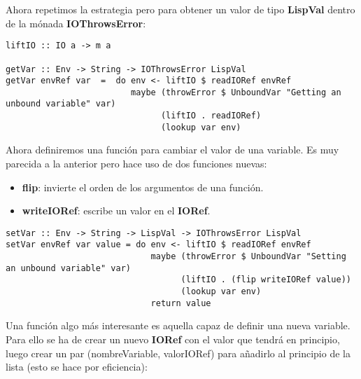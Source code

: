 Ahora repetimos la estrategia pero para obtener un valor de tipo \textbf{LispVal} dentro de la m\'onada \textbf{IOThrowsError}:\\ 

\begin{minipage}{\linewidth}
\begin{tiny}
\begin{lstlisting}[frame=single]
liftIO :: IO a -> m a

getVar :: Env -> String -> IOThrowsError LispVal
getVar envRef var  =  do env <- liftIO $ readIORef envRef
                         maybe (throwError $ UnboundVar "Getting an unbound variable" var)
                               (liftIO . readIORef)
                               (lookup var env)
\end{lstlisting}
\end{tiny}
\end{minipage}

Ahora definiremos una funci\'on para cambiar el valor de una variable. Es muy parecida a la anterior pero hace uso de dos funciones nuevas:

\begin{itemize}
  \item \textbf{flip}: invierte el orden de los argumentos de una funci\'on.
  \item \textbf{writeIORef}: escribe un valor en el \textbf{IORef}.
\end{itemize}

\begin{minipage}{\linewidth}
\begin{tiny}
\begin{lstlisting}[frame=single]
setVar :: Env -> String -> LispVal -> IOThrowsError LispVal
setVar envRef var value = do env <- liftIO $ readIORef envRef
                             maybe (throwError $ UnboundVar "Setting an unbound variable" var)
                                   (liftIO . (flip writeIORef value))
                                   (lookup var env)
                             return value
\end{lstlisting}
\end{tiny}
\end{minipage}

Una funci\'on algo m\'as interesante es aquella capaz de definir una nueva variable. Para ello se ha de crear un nuevo \textbf{IORef} con el valor que tendr\'a en principio, luego crear un par (nombreVariable, valorIORef) para a\~{n}adirlo al principio de la lista (esto se hace por eficiencia):\\

